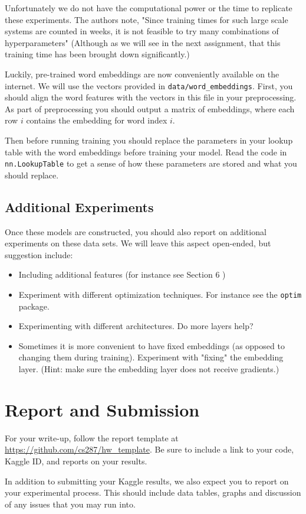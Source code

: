 \documentclass[11pt]{article}
\begin{document}
Unfortunately we do not have the computational power or the time to
replicate these experiments. The authors note, "Since training times
for such large scale systems are counted in weeks, it is not feasible
to try many combinations of hyperparameters" (Although as we will see
in the next assignment, that this training time has been brought down
significantly.)
 
Luckily, pre-trained word embeddings are now conveniently available on
the internet. We will use the vectors provided in
\texttt{data/word\_embeddings}. First, you should align the word
features with the vectors in this file in your preprocessing. 
As part of preprocessing you should output a matrix of
embeddings, where each row $i$ contains the embedding for 
word index $i$.

Then before running training you should replace the parameters in your
lookup table with the word embeddings before training your model. Read
the code in \texttt{nn.LookupTable} to get a sense of how these
parameters are stored and what you should replace.

\subsection{Additional Experiments}

Once these models are constructed, you should also report on
additional experiments on these data sets. We will leave this aspect
open-ended, but suggestion include:

\begin{itemize}
\item Including additional features (for instance see Section 6 \citep{collobert2011natural})
\item Experiment with different optimization techniques. For instance see the \texttt{optim} package. 
\item Experimenting with different architectures. Do more layers help? 
\item Sometimes it is more convenient to have fixed embeddings (as opposed to changing them during training). Experiment with "fixing" the embedding layer. (Hint: make sure the embedding layer does not receive gradients.)
\end{itemize}

\section{Report and Submission}

For your write-up, follow the report template at
\url{https://github.com/cs287/hw_template}. Be sure to include a link
to your code, Kaggle ID, and reports on your results.

In addition to submitting your Kaggle results, we also expect you to report on your 
experimental process. This should include data tables, graphs and discussion of any 
issues that you may run into. 

 

\end{document}
